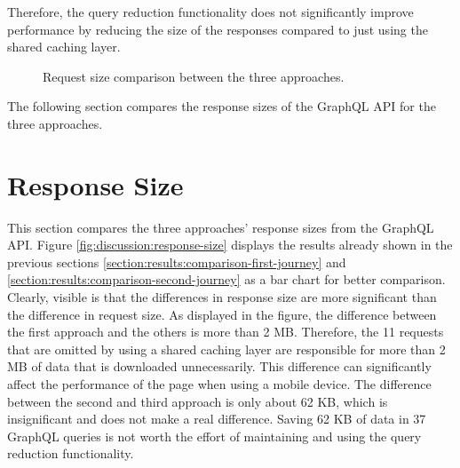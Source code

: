 \bigskip

\noindent Therefore, the query reduction functionality does not significantly improve performance by reducing the size of the responses compared to just using the shared caching layer.

\ifshowImages
\begin{figure}[H]
  \centering
  \caption{Request size comparison between the three approaches.}\label{fig:discussion:request-size}
\end{figure}
\fi

\noindent The following section compares the response sizes of the GraphQL \ac{API} for the three approaches.

\section{Response Size}\label{section:discussion:response-size}

This section compares the three approaches' response sizes from the GraphQL \ac{API}. Figure \ref{fig:discussion:response-size} displays the results already shown in the previous sections \ref{section:results:comparison-first-journey} and \ref{section:results:comparison-second-journey} as a bar chart for better comparison. Clearly, visible is that the differences in response size are more significant than the difference in request size. As displayed in the figure, the difference between the first approach and the others is more than 2 MB. Therefore, the 11 requests that are omitted by using a shared caching layer are responsible for more than 2 MB of data that is downloaded unnecessarily. This difference can significantly affect the performance of the page when using a mobile device. The difference between the second and third approach is only about 62 KB, which is insignificant and does not make a real difference. Saving 62 KB of data in 37 GraphQL queries is not worth the effort of maintaining and using the query reduction functionality. 

